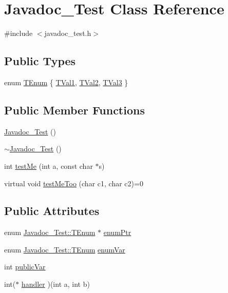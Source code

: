 \hypertarget{class_javadoc___test}{}\section{Javadoc\+\_\+\+Test Class Reference}
\label{class_javadoc___test}


{\ttfamily \#include $<$javadoc\+\_\+test.\+h$>$}

\subsection*{Public Types}
\begin{DoxyCompactItemize}
\item 
enum \hyperlink{class_javadoc___test_ae37fd1cbf1af522674cbd33873b786a6}{T\+Enum} \{ \hyperlink{class_javadoc___test_ae37fd1cbf1af522674cbd33873b786a6a90f0d8d4f07a79342261fb1c191af72b}{T\+Val1}, 
\hyperlink{class_javadoc___test_ae37fd1cbf1af522674cbd33873b786a6a5954e696a652f442d7255af4e0d35d61}{T\+Val2}, 
\hyperlink{class_javadoc___test_ae37fd1cbf1af522674cbd33873b786a6ab4a4dc16e1050c9604cf5c46a51e5a8e}{T\+Val3}
 \}
\end{DoxyCompactItemize}
\subsection*{Public Member Functions}
\begin{DoxyCompactItemize}
\item 
\hyperlink{class_javadoc___test_a17313327932ae97596b0a455ba8342cc}{Javadoc\+\_\+\+Test} ()
\item 
\hyperlink{class_javadoc___test_a60016cd15a4ed82bbc35be79a0a6a6b5}{$\sim$\+Javadoc\+\_\+\+Test} ()
\item 
int \hyperlink{class_javadoc___test_a0c472683ed25ff096e8a9edfb18d550c}{test\+Me} (int a, const char $\ast$s)
\item 
virtual void \hyperlink{class_javadoc___test_ac2b39cabbe80957ae3e8bc2bd4e887f6}{test\+Me\+Too} (char c1, char c2)=0
\end{DoxyCompactItemize}
\subsection*{Public Attributes}
\begin{DoxyCompactItemize}
\item 
enum \hyperlink{class_javadoc___test_ae37fd1cbf1af522674cbd33873b786a6}{Javadoc\+\_\+\+Test\+::\+T\+Enum} $\ast$ \hyperlink{class_javadoc___test_abcb36df9d8af3e69290c239ba483d6df}{enum\+Ptr}
\item 
enum \hyperlink{class_javadoc___test_ae37fd1cbf1af522674cbd33873b786a6}{Javadoc\+\_\+\+Test\+::\+T\+Enum} \hyperlink{class_javadoc___test_a689558649150237b53a5c8ed89c996c2}{enum\+Var}
\item 
int \hyperlink{class_javadoc___test_a44a516fbc3a4865e2dcae34649c9df6a}{public\+Var}
\item 
int($\ast$ \hyperlink{class_javadoc___test_ace81a523a4eef44501a841a6d338832b}{handler} )(int a, int b)
\end{DoxyCompactItemize}


